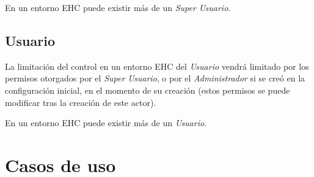 En un entorno EHC puede existir m\'as de un \textit{Super Usuario}.

\subsection{Usuario}
La limitaci\'on del control en un entorno EHC del \textit{Usuario} vendr\'a limitado por los permisos otorgados por el \textit{Super Usuario}, o por el \textit{Administrador} si se cre\'o en la configuraci\'on inicial, en el momento de su creaci\'on (estos permisos se puede modificar tras la creaci\'on de este actor).

En un entorno EHC puede existir m\'as de un \textit{Usuario}.

\section{Casos de uso}